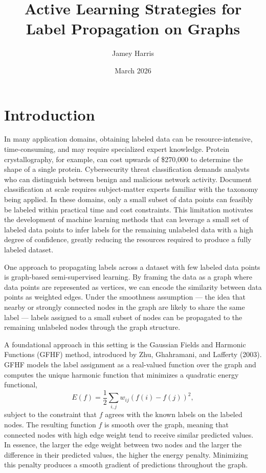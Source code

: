 \documentclass{article}
\title{Active Learning Strategies for Label Propagation on Graphs}
\author{Jamey Harris}
\date{March 2026}
\begin{document}
\maketitle

\section{Introduction}

In many application domains, obtaining labeled data can be resource-intensive, time-consuming, and may require specialized expert knowledge. Protein crystallography, for example, can cost upwards of \$270,000 to determine the shape of a single protein. Cybersecurity threat classification demands analysts who can distinguish between benign and malicious network activity. Document classification at scale requires subject-matter experts familiar with the taxonomy being applied. In these domains, only a small subset of data points can feasibly be labeled within practical time and cost constraints. This limitation motivates the development of machine learning methods that can leverage a small set of labeled data points to infer labels for the remaining unlabeled data with a high degree of confidence, greatly reducing the resources required to produce a fully labeled dataset.

One approach to propagating labels across a dataset with few labeled data points is graph-based semi-supervised learning. By framing the data as a graph where data points are represented as vertices, we can encode the similarity between data points as weighted edges. Under the smoothness assumption --- the idea that nearby or strongly connected nodes in the graph are likely to share the same label --- labels assigned to a small subset of nodes can be propagated to the remaining unlabeled nodes through the graph structure.

A foundational approach in this setting is the Gaussian Fields and Harmonic Functions (GFHF) method, introduced by Zhu, Ghahramani, and Lafferty (2003). GFHF models the label assignment as a real-valued function over the graph and computes the unique harmonic function that minimizes a quadratic energy functional,
\[
E(f) = \frac{1}{2} \sum_{i,j} w_{ij}(f(i) - f(j))^2,
\]
subject to the constraint that $f$ agrees with the known labels on the labeled nodes. The resulting function $f$ is smooth over the graph, meaning that connected nodes with high edge weight tend to receive similar predicted values. In essence, the larger the edge weight between two nodes and the larger the difference in their predicted values, the higher the energy penalty. Minimizing this penalty produces a smooth gradient of predictions throughout the graph.
\end{document}
